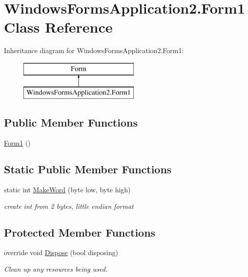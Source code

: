 \hypertarget{class_windows_forms_application2_1_1_form1}{}\section{Windows\+Forms\+Application2.\+Form1 Class Reference}
\label{class_windows_forms_application2_1_1_form1}
Inheritance diagram for Windows\+Forms\+Application2.\+Form1\+:\begin{figure}[H]
\begin{center}
\leavevmode
\includegraphics[height=2.000000cm]{class_windows_forms_application2_1_1_form1}
\end{center}
\end{figure}
\subsection*{Public Member Functions}
\begin{DoxyCompactItemize}
\item 
\hyperlink{class_windows_forms_application2_1_1_form1_a33adff6125395f3e1c655152b0225a1c}{Form1} ()
\end{DoxyCompactItemize}
\subsection*{Static Public Member Functions}
\begin{DoxyCompactItemize}
\item 
static int \hyperlink{class_windows_forms_application2_1_1_form1_a5b38b3c8dc487bcfd14f3e82e7c7a178}{Make\+Word} (byte low, byte high)
\begin{DoxyCompactList}\small\item\em create int from 2 bytes, little endian format \end{DoxyCompactList}\end{DoxyCompactItemize}
\subsection*{Protected Member Functions}
\begin{DoxyCompactItemize}
\item 
override void \hyperlink{class_windows_forms_application2_1_1_form1_aad16a744e3df3421fa1612f17958440d}{Dispose} (bool disposing)
\begin{DoxyCompactList}\small\item\em Clean up any resources being used. \end{DoxyCompactList}\end{DoxyCompactItemize}
